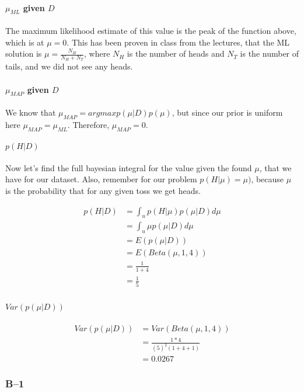 \documentclass[paper=a4, fontsize=11pt]{scrartcl} %
\begin{document}
\paragraph{$\mu_{ML}$ given $D$}
The maximum likelihood estimate of this value is the peak of the function above, which is at $\mu = 0$.
This has been proven in class from the lectures, that the ML solution is  $\mu = \frac{N_H}{N_H+N_T}$, where $N_H$ is the number of heads and $N_T$ is the number of tails, and we did not see any heads.

\paragraph{$\mu_{MAP}$ given $D$}
We know that $\mu_{MAP} = argmax p(\mu|D)p(\mu)$, but since our prior is uniform here $\mu_{MAP} = \mu_{ML}$.  Therefore, $\mu_{MAP} = 0$.

\paragraph{$p(H|D)$}
Now let's find the full bayesian integral for the value given the found $\mu$, that we have for our dataset.  Also, remember for our problem $p(H|\mu) = \mu)$, because $\mu$ is the probability that for any given toss we get heads.

\begin{align}
p(H|D) &= \int_u p(H|\mu)p(\mu|D)d\mu \\
&= \int_u \mu p(\mu|D)d\mu \\
&= E( p(\mu|D)) \\
&= E( Beta(\mu,1,4)) \\
&= \frac{1}{1+4} \\
&= \frac{1}{5} \\
\end{align}

\paragraph{$Var(p(\mu|D))$}

\begin{align}
Var(p(\mu|D)) &=  Var(Beta(\mu,1,4)) \\
&= \frac{1*4}{(5)^2(1+4+1)} \\
&= 0.0267
\end{align}

\subsubsection{B--1}
\end{document}

